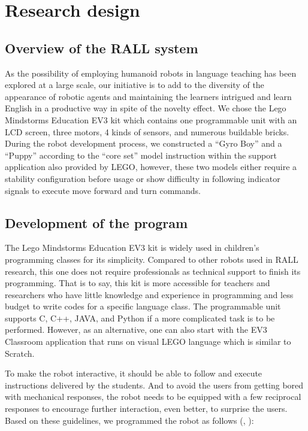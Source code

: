 \documentclass[english]{textolivre}
\begin{document}
\section{Research design}\label{sec-fmt-manuscrito}

\subsection{Overview of the RALL system }
As the possibility of employing humanoid robots in language teaching has been explored at a large scale, our initiative is to add to the diversity of the appearance of robotic agents and maintaining the learners intrigued and learn English in a productive way in spite of the novelty effect. We chose the Lego Mindstorms Education EV3 kit which contains one programmable unit with an LCD screen, three motors, 4 kinds of sensors, and numerous buildable bricks. During the robot development process, we constructed a “Gyro Boy” and a “Puppy” according to the “core set” model instruction within the support application also provided by LEGO, however, these two models either require a stability configuration before usage or show difficulty in following indicator signals to execute move forward and turn commands.


\subsection{Development of the program}\label{sec-formato}
The Lego Mindstorms Education EV3 kit is widely used in children's programming classes for its simplicity. Compared to other robots used in RALL research, this one does not require professionals as technical support to finish its programming. That is to say, this kit is more accessible for teachers and researchers who have little knowledge and experience in programming and less budget to write codes for a specific language class. The programmable unit supports C, C++, JAVA, and Python if a more complicated task is to be performed. However, as an alternative, one can also start with the EV3 Classroom application that runs on visual LEGO language which is similar to Scratch.

To make the robot interactive, it should be able to follow and execute instructions delivered by the students. And to avoid the users from getting bored with mechanical responses, the robot needs to be equipped with a few reciprocal responses to encourage further interaction, even better, to surprise the users. Based on these guidelines, we programmed the robot as follows (, ):
\end{document}
